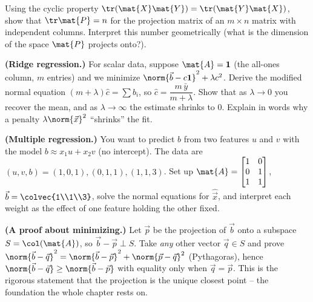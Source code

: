 \begin{exercise}\label{ch19:ex-trace-rank}
Using the cyclic property $\tr(\mat{X}\mat{Y})=\tr(\mat{Y}\mat{X})$, show that $\tr\mat{P}=n$ for
the projection matrix of an $m\times n$ matrix with independent columns. Interpret this number
geometrically (what is the dimension of the space $\mat{P}$ projects onto?).
\end{exercise}

\begin{exercise}\label{ch19:ex-ridge}
\textbf{(Ridge regression.)} For scalar data, suppose $\mat{A}=\mathbf{1}$ (the all-ones column,
$m$ entries) and we minimize $\norm{\vec{b}-c\mathbf{1}}^2+\lambda c^2$. Derive the modified normal
equation $(m+\lambda)\hat{c}=\sum b_i$, so $\hat{c}=\dfrac{m\,\bar{y}}{m+\lambda}$. Show that as
$\lambda\to 0$ you recover the mean, and as $\lambda\to\infty$ the estimate shrinks to $0$.
Explain in words why a penalty $\lambda\norm{\vec{x}}^2$ ``shrinks'' the fit.
\end{exercise}

\begin{exercise}\label{ch19:ex-two-features}
\textbf{(Multiple regression.)} You want to predict $b$ from two features $u$ and $v$ with the
model $b\approx x_1 u + x_2 v$ (no intercept). The data are
$(u,v,b)=(1,0,1),(0,1,1),(1,1,3)$. Set up $\mat{A}=\begin{bmatrix}1&0\\0&1\\1&1\end{bmatrix}$,
$\vec{b}=\colvec{1\\1\\3}$, solve the normal equations for $\hat{\vec{x}}$, and interpret each
weight as the effect of one feature holding the other fixed.
\end{exercise}

\begin{exercise}\label{ch19:ex-why-squares}
\textbf{(A proof about minimizing.)} Let $\vec{p}$ be the projection of $\vec{b}$ onto a subspace
$S=\col(\mat{A})$, so $\vec{b}-\vec{p}\perp S$. Take \emph{any} other vector $\vec{q}\in S$ and
prove $\norm{\vec{b}-\vec{q}}^2=\norm{\vec{b}-\vec{p}}^2+\norm{\vec{p}-\vec{q}}^2$ (Pythagoras),
hence $\norm{\vec{b}-\vec{q}}\ge\norm{\vec{b}-\vec{p}}$ with equality only when $\vec{q}=\vec{p}$.
This is the rigorous statement that the projection is the unique closest point -- the foundation the
whole chapter rests on.
\end{exercise}
